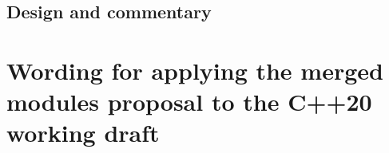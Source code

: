\documentclass[ebook,10pt,oneside,openany,final]{memoir}
\begin{document}
\pagestyle{cpppage}



\frontmatter



\mainmatter
\setglobalstyles

\begin{KeepFromToc}
\part[Commentary]{Design and commentary}\label{commentary}



\end{KeepFromToc}

\part[Wording]{Wording for applying the merged modules proposal to the C++20 working draft}\label{wording}

%
%
%
%











\appendix


%


\end{document}
